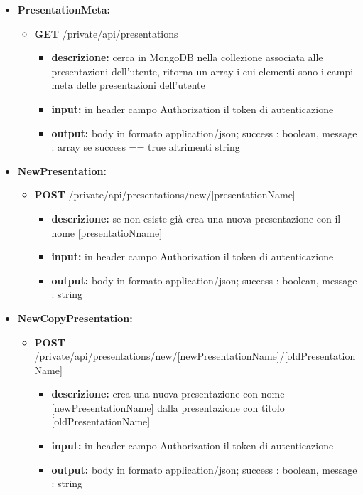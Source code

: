{{\begin{itemize}
		\item \textbf{PresentationMeta:}
			\begin{itemize}
			\item  \textbf{GET} /private/api/presentations 
				\begin{itemize} 
				\item \textbf{descrizione:} cerca in MongoDB nella collezione associata alle presentazioni dell'utente, ritorna un array i cui elementi sono i campi meta delle presentazioni dell'utente
				\item \textbf{input:} in header campo Authorization il token di autenticazione
				\item \textbf{output:} body in formato application/json; success : boolean, message : array se success == true altrimenti string
				\end{itemize}
			\end{itemize}
			
		\item \textbf{NewPresentation:}
			\begin{itemize}
			\item  \textbf{POST} /private/api/presentations/new/[presentationName] 
				\begin{itemize} 
				\item \textbf{descrizione:} se non esiste gi\`{a} crea una nuova presentazione con il nome [presentatioNname]
				\item \textbf{input:} in header campo Authorization il token di autenticazione
				\item \textbf{output:}  body in formato application/json; success : boolean, message : string
				\end{itemize}
			\end{itemize}
			
		\item \textbf{NewCopyPresentation:}
			\begin{itemize}
			\item  \textbf{POST} /private/api/presentations/new/[newPresentationName]/[oldPresentationName]
				\begin{itemize} 
				\item \textbf{descrizione:} crea una nuova presentazione con nome [newPresentationName] dalla presentazione con titolo [oldPresentationName]
				\item \textbf{input:} in header campo Authorization il token di autenticazione
				\item \textbf{output:}  body in formato application/json; success : boolean, message : string
				\end{itemize}
			\end{itemize}


\end{itemize}}}
